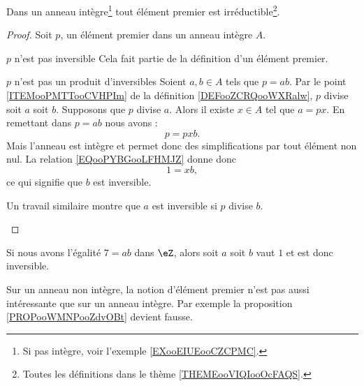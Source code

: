 \begin{proposition}     \label{PROPooWMNPooZdvOBt}
    Dans un anneau intègre\footnote{Si pas intègre, voir l'exemple \ref{EXooEIUEooCZCPMC}.} tout élément premier est irréductible\footnote{Toutes les définitions dans le thème \ref{THEMEooVIQIooOcFAQS}.}.
\end{proposition}
    
\begin{proof}
    Soit \( p\), un élément premier dans un anneau intègre \( A\).
    \begin{subproof}
        \item[\( p\) n'est pas inversible]
            Cela fait partie de la définition d'un élément premier.
        \item[\( p\) n'est pas un produit d'inversibles]
            Soient \( a,b\in A\) tels que \( p=ab\). Par le point \ref{ITEMooPMTTooCVHPIm} de la définition \ref{DEFooZCRQooWXRalw}, \( p\) divise soit \( a\) soit \( b\). Supposons que \( p\) divise \( a\). Alors il existe \( x\in A\) tel que \( a=px\). En remettant dans \( p=ab\) nous avons :
            \begin{equation}        \label{EQooPYBGooLFHMJZ}
                p=pxb.
            \end{equation}
            Mais l'anneau est intègre et permet donc des simplifications par tout élément non nul. La relation \ref{EQooPYBGooLFHMJZ} donne donc 
            \begin{equation}
                1=xb,
            \end{equation}
            ce qui signifie que \( b\) est inversible.

            Un travail similaire montre que \( a\) est inversible si \( p\) divise \( b\).
    \end{subproof}
\end{proof}

\begin{example}
    Si nous avons l'égalité \( 7=ab\) dans \( \eZ\), alors soit \( a\) soit \( b\) vaut \( 1\) et est donc inversible.
\end{example}

Sur un anneau non intègre, la notion d'élément premier n'est pas aussi intéressante que sur un anneau intègre. Par exemple la proposition \ref{PROPooWMNPooZdvOBt} devient fausse.

